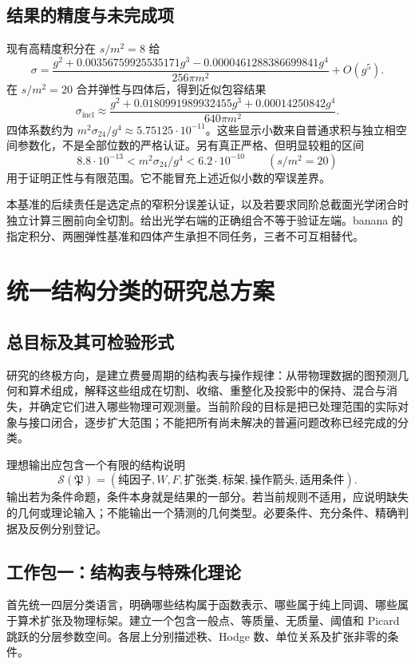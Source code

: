 \documentclass[11pt,a4paper,oneside]{ctexrep}
\theoremstyle{cnplain}
\theoremstyle{definition}
\theoremstyle{remark}
\begin{document}
\section{结果的精度与未完成项}
现有高精度积分在 $s/m^2=8$ 给
\begin{equation}
 \sigma=\frac{g^2+0.00356759925535171g^3
 -0.0000461288386699841g^4}{256\pi m^2}+O(g^5).
\end{equation}
在 $s/m^2=20$ 合并弹性与四体后，得到近似包容结果
\begin{equation}
 \sigma_{\mathrm{incl}}\approx
 \frac{g^2+0.0180991989932455g^3+0.00014250842g^4}{640\pi m^2}.
\end{equation}
四体系数约为 $m^2\sigma_{24}/g^4\approx5.75125\cdot10^{-11}$。这些显示小数来自普通求积与独立相空间参数化，不是全部位数的严格认证。另有真正严格、但明显较粗的区间
\begin{equation}
 8.8\cdot10^{-13}<m^2\sigma_{24}/g^4<6.2\cdot10^{-10}
 \qquad(s/m^2=20)
\end{equation}
用于证明正性与有限范围。它不能冒充上述近似小数的窄误差界。

本基准的后续责任是选定点的窄积分误差认证，以及若要求同阶总截面光学闭合时独立计算三圈前向全切割。给出光学右端的正确组合不等于验证左端。banana 的指定积分、两圈弹性基准和四体产生承担不同任务，三者不可互相替代。


\chapter{统一结构分类的研究总方案}\label{ch:roadmap}
\section{总目标及其可检验形式}
研究的终极方向，是建立费曼周期的结构表与操作规律：从带物理数据的图预测几何和算术组成，解释这些组成在切割、收缩、重整化及投影中的保持、混合与消失，并确定它们进入哪些物理可观测量。当前阶段的目标是把已处理范围的实际对象与接口闭合，逐步扩大范围；不能把所有尚未解决的普遍问题改称已经完成的分类。

理想输出应包含一个有限的结构说明
\begin{equation}
 \mathscr S(\mathfrak P)=
 (\text{纯因子},W,F,\text{扩张类},\text{标架},
 \text{操作箭头},\text{适用条件}).
\end{equation}
输出若为条件命题，条件本身就是结果的一部分。若当前规则不适用，应说明缺失的几何或理论输入；不能输出一个猜测的几何类型。必要条件、充分条件、精确判据及反例分别登记。

\section{工作包一：结构表与特殊化理论}
首先统一四层分类语言，明确哪些结构属于函数表示、哪些属于纯上同调、哪些属于算术扩张及物理标架。建立一个包含一般点、等质量、无质量、阈值和 Picard 跳跃的分层参数空间。各层上分别描述秩、Hodge 数、单位关系及扩张非零的条件。
\end{document}
